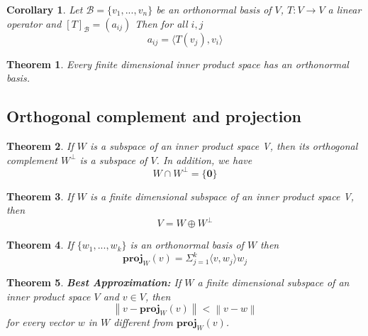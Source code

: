 \documentclass{article}
\newcommand{\norm}[1]{\left\lVert#1\right\rVert}
\newcommand{\innerproduct}[1]{\langle#1\rangle}
\newtheorem{theorem}{Theorem}[section]
\newtheorem{corollary}{Corollary}[theorem]
\numberwithin{theorem}{subsection} %
\numberwithin{definition}{subsection} %
\numberwithin{proposition}{subsection} %
\begin{document}
\begin{corollary}

    Let $ \mathcal{B} = \{v_1,...,v_n\}$ be an orthonormal basis of $V$,
    $T:V\rightarrow V$ a linear operator and $[T]_\mathcal{B} = (a_{ij})$ Then for all $i,j$ \\
    \begin{equation*}
    a_{ij}=\innerproduct{T(v_j), v_i}
    \end{equation*}
\end{corollary}

\begin{theorem}
    Every finite dimensional inner product space has an orthonormal basis.
\end{theorem}



\subsection{Orthogonal complement and projection}
\begin{theorem}
    If $W$ is a subspace of an inner product space V, then its orthogonal complement
    $W^{\perp}$ is a subspace of $V$. In addition, we have
    \begin{equation*}
        W \cap W^{\perp} = \{\mathbf{0}\}
    \end{equation*}
\end{theorem}

\begin{theorem}
    If $W$ is a finite dimensional subspace of an inner product space V, then
    \begin{equation*}
        V = W \oplus W^{\perp} 
    \end{equation*}
\end{theorem}

\begin{theorem}
    If $\{w_1, ..., w_k\}$ is an orthonormal basis of $W$ then 
    \begin{equation*}
        \mathbf{proj}_W(v) = \Sigma^k_{j=1} \innerproduct{v,w_j}w_j
    \end{equation*}
\end{theorem}


\begin{theorem} 
    \textbf{Best Approximation:}
    If $W$ a finite dimensional subspace of an inner product space $V$ and $v \in V$, then
    \begin{equation*}
        \norm{v-\mathbf{proj}_W(v)} < \norm{v-w}
    \end{equation*}
    for every vector $w$ in $W$ different from $\mathbf{proj}_W(v)$.
\end{theorem}
\end{document}
